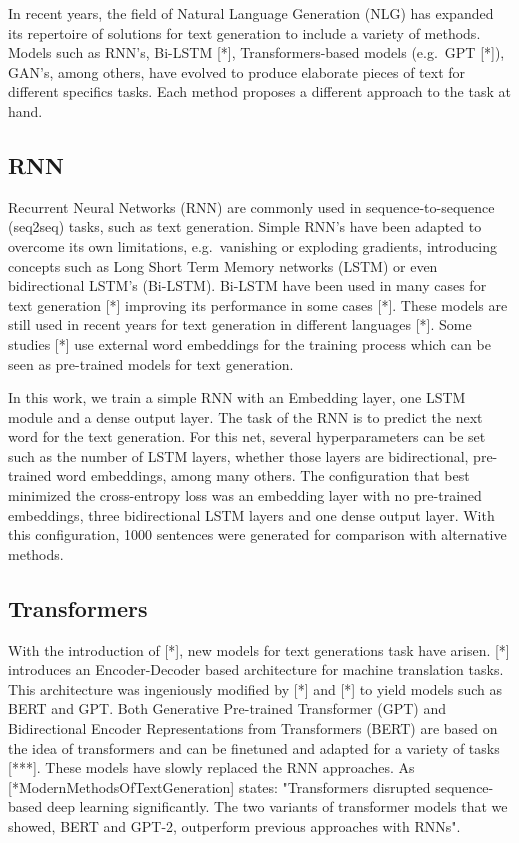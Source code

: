 \documentclass[10pt,twocolumn,letterpaper]{article}
\begin{document}
In recent years, the field of Natural Language Generation (NLG) has expanded its repertoire
of solutions for text generation to include a variety of methods.
Models such as RNN's, Bi-LSTM [*], Transformers-based models (e.g.\ GPT [*]), GAN's, among others, have evolved
to produce elaborate pieces of text for different specifics tasks.
Each method proposes a different approach to the task at hand.

\subsection{RNN}

Recurrent Neural Networks (RNN) are commonly used in sequence-to-sequence (seq2seq) tasks, such as text generation.
Simple RNN's have been adapted to overcome its own limitations, e.g.\ vanishing or exploding gradients,
introducing concepts such as Long Short Term Memory networks (LSTM) or even bidirectional LSTM's (Bi-LSTM).
Bi-LSTM have been used in many cases for text generation [*] improving its performance in some cases [*].
These models are still used in recent years for text generation in different languages [*].
Some studies [*] use external word embeddings for the training process which can be seen as pre-trained
models for text generation.

In this work, we train a simple RNN with an Embedding layer, one LSTM module and a dense output layer.
The task of the RNN is to predict the next word for the text generation.
For this net, several hyperparameters can be set such as the number of LSTM layers, whether those layers
are bidirectional, pre-trained word embeddings, among many others.
The configuration that best minimized the cross-entropy loss was an embedding layer with no pre-trained embeddings,
three bidirectional LSTM layers and one dense output layer.
With this configuration, 1000 sentences were generated for comparison with alternative methods.

\subsection{Transformers}

With the introduction of [*], new models for text generations task have arisen.
[*] introduces an Encoder-Decoder based architecture for machine translation tasks.
This architecture was ingeniously modified by [*] and [*] to yield models such as BERT and GPT.
Both Generative Pre-trained Transformer (GPT) and Bidirectional Encoder Representations from Transformers (BERT)
are based on the idea of transformers and can be finetuned and adapted for a variety of tasks [***].
These models have slowly replaced the RNN approaches.
As [*ModernMethodsOfTextGeneration] states: "Transformers disrupted sequence-based deep learning significantly.
The two variants of transformer models that we showed, BERT and GPT-2, outperform
previous approaches with RNNs".
\end{document}
